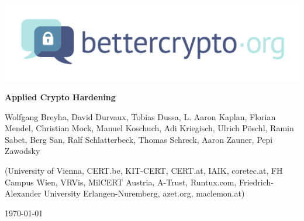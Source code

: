 \begin{titlepage}
  \begin{center}
    \includegraphics[scale=0.5]{img/logo}
    \vspace{45pt}
    \HorRule
    \medskip
    {\fontsize{35}{36} \bfseries Applied Crypto Hardening\par}
    \bigskip
  \end{center}
  \begin{flushleft}
    {\large \color{intersectgreen} Wolfgang Breyha, David Durvaux, Tobias
      Dussa, L. Aaron Kaplan, Florian Mendel, Christian Mock, Manuel Koschuch,
      Adi Kriegisch, Ulrich P\"oschl, Ramin Sabet, Berg San, Ralf
      Schlatterbeck, Thomas Schreck, Aaron Zauner, Pepi Zawodsky
      \par}
    \bigskip
    (University of Vienna, CERT.be, KIT-CERT, CERT.at, IAIK, coretec.at, FH
    Campus Wien, VRVis, MilCERT Austria, A-Trust, Runtux.com,
    Friedrich-Alexander University Erlangen-Nuremberg, azet.org, maclemon.at)
  \end{flushleft}
  \medskip
  \HorRule
  \begin{center}
    \today
  \end{center}
\end{titlepage}
